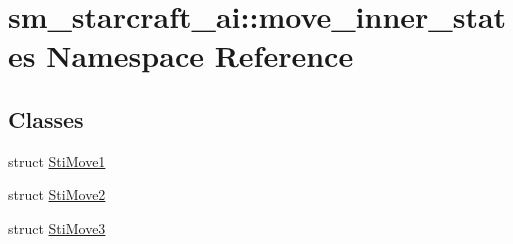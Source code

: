 \hypertarget{namespacesm__starcraft__ai_1_1move__inner__states}{}\section{sm\+\_\+starcraft\+\_\+ai\+:\+:move\+\_\+inner\+\_\+states Namespace Reference}
\label{namespacesm__starcraft__ai_1_1move__inner__states}
\subsection*{Classes}
\begin{DoxyCompactItemize}
\item 
struct \hyperlink{structsm__starcraft__ai_1_1move__inner__states_1_1StiMove1}{Sti\+Move1}
\item 
struct \hyperlink{structsm__starcraft__ai_1_1move__inner__states_1_1StiMove2}{Sti\+Move2}
\item 
struct \hyperlink{structsm__starcraft__ai_1_1move__inner__states_1_1StiMove3}{Sti\+Move3}
\end{DoxyCompactItemize}
